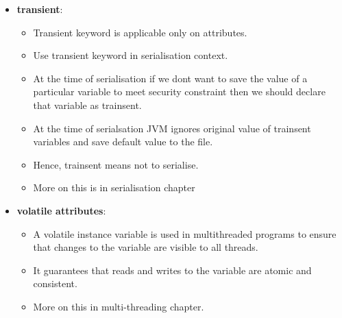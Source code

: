 \begin{flushleft}
\begin{itemize}
\begin{itemize}
\begin{itemize}
			\end{itemize}
			
		\end{itemize}
	
		\newpage
		\item \textbf{transient}: 
		\begin{itemize}
			\item Transient keyword is applicable only on attributes.
			\item Use transient keyword in serialisation context.
			\item At the time of serialisation if we dont want to save the value of a particular variable to meet security constraint then we should declare that variable as trainsent.
			\item At the time of serialsation JVM ignores original value of trainsent variables and save default value to the file. 
			\item Hence, trainsent means not to serialise.
			\item More on this is in serialisation chapter
		\end{itemize}
		\bigskip
		\item \textbf{volatile attributes}: 
		\begin{itemize}
			\item A volatile instance variable is used in multithreaded programs to ensure that changes to the variable are visible to all threads. 
			\item It guarantees that reads and writes to the variable are atomic and consistent.
			\item More on this in multi-threading chapter.		
		\end{itemize}
		
	\end{itemize}
	
	
	

	
	
\end{flushleft}

\newpage

